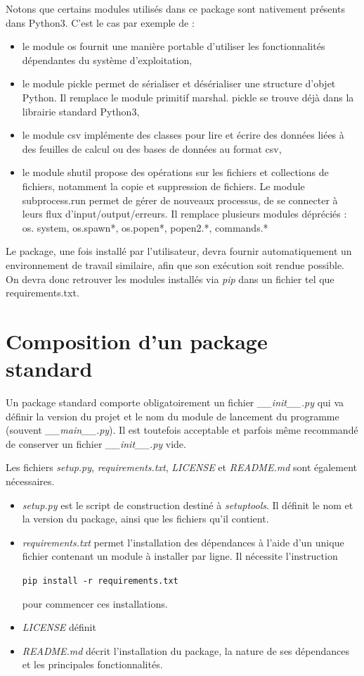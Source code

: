 \documentclass[twoside,a4paper,11pt,frenchb,openany]{report}
\begin{document}
Notons que certains modules utilisés dans ce package sont nativement présents dans Python3. C'est le cas par exemple de :
\begin{itemize}
\item le module os fournit une manière portable d'utiliser les fonctionnalités dépendantes du système d'exploitation,
\item le module pickle permet de sérialiser et désérialiser une structure d'objet Python. Il remplace le module primitif marshal. pickle se trouve déjà dans la librairie standard Python3,
\item le module csv implémente des classes pour lire et écrire des données liées à des feuilles de calcul ou des bases de données au format csv,
\item le module shutil propose des opérations sur les fichiers et collections de fichiers, notamment la copie et suppression de fichiers.
Le module subprocess.run permet de gérer de nouveaux processus, de se connecter à leurs flux d'input/output/erreurs. Il remplace plusieurs modules dépréciés : os. system, os.spawn*, os.popen*, popen2.*, commands.* 
\end{itemize}

Le package, une fois installé par l'utilisateur, devra fournir automatiquement un environnement de travail similaire, afin que son exécution soit rendue possible. On devra donc retrouver les modules installés via \textit{pip} dans un fichier tel que requirements.txt.
 

\section{Composition d'un package standard}

Un package standard comporte obligatoirement un fichier \textit{\_\_init\_\_.py} qui va définir la version du projet et le nom du module de lancement du programme (souvent \textit{\_\_main\_\_.py}). Il est toutefois acceptable et parfois même recommandé de conserver un fichier \textit{\_\_init\_\_.py} vide. 

Les fichiers \textit{setup.py},  \textit{requirements.txt}, \textit{LICENSE} et \textit{README.md} sont également nécessaires.  
\begin{itemize}
\item \textit{setup.py} est le script de construction destiné à \textit{setuptools}. Il définit le nom et la version du package, ainsi que les fichiers qu'il contient. 
\item \textit{requirements.txt} permet l'installation des dépendances à l'aide d'un unique fichier contenant un module à installer par ligne. Il nécessite l'instruction 
\begin{tcolorbox}\texttt{pip install -r requirements.txt}\end{tcolorbox}
pour commencer ces installations.
\item \textit{LICENSE} définit 
\item \textit{README.md} décrit l'installation du package, la nature de ses dépendances et les principales fonctionnalités.
\end{itemize}
\end{document}
